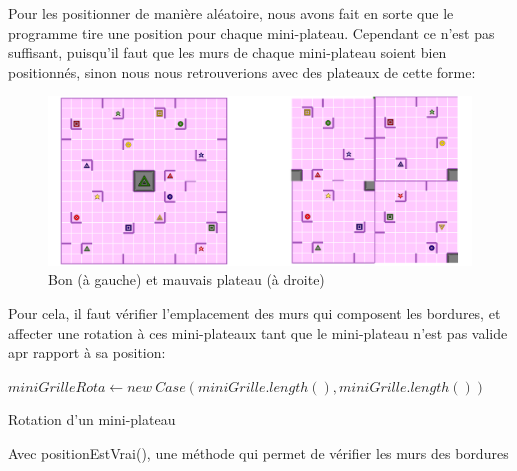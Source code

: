 \documentclass[a4paper, 12pt]{article}
\begin{document}
            Pour les positionner de manière aléatoire, nous avons fait en sorte que le programme tire une position pour chaque mini-plateau. Cependant ce n'est pas suffisant, puisqu'il faut que les murs de chaque mini-plateau soient bien positionnés, sinon nous nous retrouverions avec des plateaux de cette forme:
            
            \begin{figure}[H]
                \centering
                \includegraphics[scale=0.2]{images/bonvsmauvais.png}
                \caption{Bon (à gauche) et mauvais plateau (à droite)}
            \end{figure}
            
            Pour cela, il faut vérifier l'emplacement des murs qui composent les bordures, et affecter une rotation à ces mini-plateaux tant que le mini-plateau n'est pas valide apr rapport à sa position:
            
            \begin{algorithm}[H]%
                \DontPrintSemicolon
                $miniGrilleRota \gets new \ Case(miniGrille.length(), miniGrille.length())$
                \;
                \caption{\sc Rotation d'un mini-plateau}
                Avec positionEstVrai(), une méthode qui permet de vérifier les murs des bordures
            \end{algorithm}%
        
\end{document}
